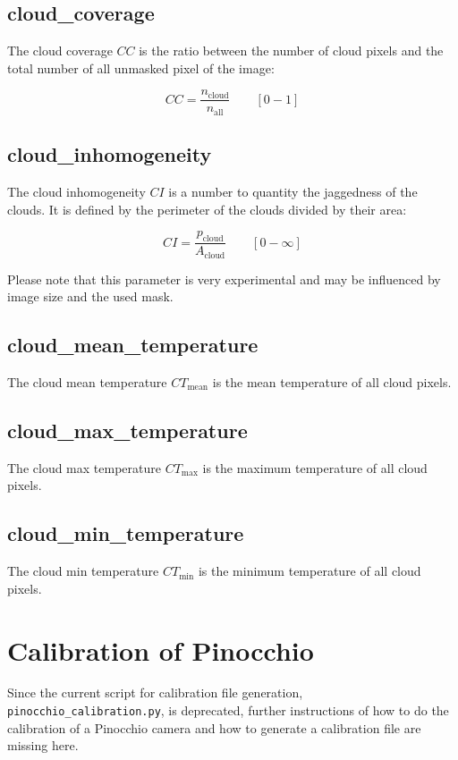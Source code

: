 \documentclass[11pt,a4paper]{article}
\begin{document}
\subsection{cloud\_coverage}
The cloud coverage $CC$ is the ratio between the number of cloud pixels and the total number of all unmasked pixel of the image:

\begin{equation}
	CC = \frac{n_\text{cloud}}{n_\text{all}} \qquad [0 - 1]
\end{equation}

\subsection{cloud\_inhomogeneity}
The cloud inhomogeneity $CI$ is a number to quantity the jaggedness of the clouds. It is defined by the perimeter of the clouds divided by their area:

\begin{equation}
	CI = \frac{p_\text{cloud}}{A_\text{cloud}} \qquad [0 - \infty]
\end{equation}

Please note that this parameter is very experimental and may be influenced by image size and the used mask.

\subsection{cloud\_mean\_temperature}
The cloud mean temperature $CT_\text{mean}$ is the mean temperature of all cloud pixels.

\subsection{cloud\_max\_temperature}
The cloud max temperature $CT_\text{max}$ is the maximum temperature of all cloud pixels.

\subsection{cloud\_min\_temperature}
The cloud min temperature $CT_\text{min}$ is the minimum temperature of all cloud pixels.

\section{Calibration of Pinocchio}
\label{sec:calibration}
Since the current script for calibration file generation, \texttt{pinocchio\_calibration.py}, is deprecated, further instructions of how to do the calibration of a Pinocchio camera and how to generate a calibration file are missing here.
\end{document}
